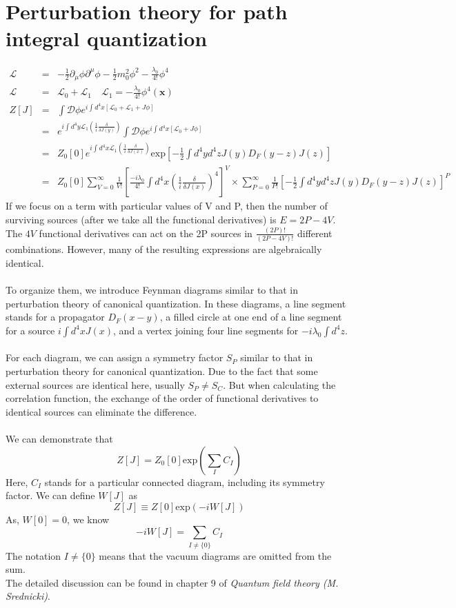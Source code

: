 \section{Perturbation theory for path integral quantization}
\begin{eqnarray}
\mathcal{L} &=& -\frac{1}{2}\partial_{\mu} \phi \partial^{\mu} \phi -\frac{1}{2}m_0^2 \phi^2 -\frac{\lambda_0}{4!}\phi^4 \nonumber \\
\mathcal{L} &=& \mathcal{L}_0 + \mathcal{L}_1 \quad \mathcal{L}_1 =- \frac{\lambda_0}{4!} \phi^4 (\bm{x}) \nonumber \\
Z[J] &=& \int \mathcal{D}\phi e^{i\int d^4x [\mathcal{L}_0 + \mathcal{L}_1 + J\phi]} \nonumber \\
&=& e^{i\int d^4y \mathcal{L}_1(\frac{1}{i} \frac{\delta}{\delta J(y)})} \int \mathcal{D}\phi e^{i\int d^4x [\mathcal{L}_0 + J\phi]} \nonumber \\
& = & Z_0[0]e^{i\int d^4x \mathcal{L}_1(\frac{1}{i} \frac{\delta}{\delta J(x)})} \mathrm{exp} [-\frac{1}{2} \int d^4y d^4z J(y)D_F(y-z)J(z)] \nonumber \\
& =& Z_0[0]\sum_{V=0}^{\infty} \frac{1}{V!} [ \frac{-i\lambda_0}{4!} \int d^4x (\frac{1}{i} \frac{\delta}{\delta J(x)})^4]^V \times \sum_{P=0}^{\infty} \frac{1}{P!} [-\frac{1}{2} \int d^4y d^4z J(y)D_F(y-z)J(z)]^P \nonumber
\end{eqnarray}
If we focus on a term with particular values of V and P, then
the number of surviving sources (after we take all the functional derivatives) is $E = 2P-4V$. The $4V$ functional derivatives can act on the 2P sources in $\frac{(2P)!}{(2P-4V)!}$ different combinations. However, many of the resulting expressions are algebraically identical.\\ \\
To organize them, we introduce Feynman diagrams similar to that in perturbation theory of canonical quantization. In these diagrams, a line segment stands for a propagator $D_F(x-y)$, a filled circle at one end of a line segment for a source $i\int d^4x J(x)$, and a vertex joining four line segments for $-i\lambda_0 \int d^4 z$.\\ \\
For each diagram, we can assign a symmetry factor $S_P$ similar to that in perturbation theory for canonical quantization. Due to the fact that some external sources are identical here, usually $S_P \neq S_C$. But when calculating the correlation function, the exchange of the order of functional derivatives to identical sources can eliminate the difference.\\ \\
We can demonstrate that
\[Z[J] = Z_0[0] \mathrm{exp}(\sum_I C_I)\]
Here, $C_I$ stands for a particular connected diagram, including its symmetry factor. We can define $W[J]$ as
\[Z[J] \equiv Z[0] \mathrm{exp}(-iW[J])\]
As, $W[0]=0$, we know
\[-iW[J] = \sum_{I \neq \{0\}} C_I\]
The notation $I\neq \{0\}$ means that the vacuum diagrams are omitted from the sum.\\
The detailed discussion can be found in chapter 9 of \emph{Quantum field theory (M. Srednicki)}.

